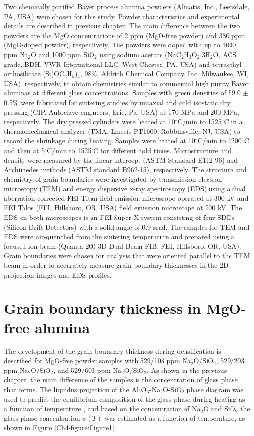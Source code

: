 Two chemically purified Bayer process alumina powders (Almatis, Inc., Leetsdale, PA, USA) were chosen for this study. Powder characteristics and experimental details are described in previous chapter. The main difference between the two powders are the MgO concentrations of 2 ppm (MgO-free powder) and 380 ppm (MgO-doped powder), respectively. The powders were doped with up to 1000 ppm Na$_{2}$O and 1000 ppm SiO$_{2}$ using sodium acetate (NaC$_{2}$H$_{3}$O$_{2}$$\cdot$3H$_{2}$O, ACS grade, BDH, VWR International LLC, West Chester, PA, USA) and tetraethyl orthosilicate (Si(OC$_{2}$H$_{5}$)$_{4}$, 98\%, Aldrich Chemical Company, Inc. Milwaukee, WI, USA), respectively, to obtain chemistries similar to commercial high purity Bayer aluminas at different glass concentrations. Samples with green densities of 59.0 $\pm$ 0.5\% were fabricated for sintering studies by uniaxial and cold isostatic dry pressing (CIP, Autoclave engineers, Erie, Pa, USA) at 170 MPa and 200 MPa, respectively. The dry pressed cylinders were heated at 10$^{\circ}$C/min to 1525$^{\circ}$C in a thermomechanical analyzer (TMA, Linseis PT1600, Robbinsville, NJ, USA) to record the shrinkage during heating. Samples were heated at 10$^{\circ}$C/min to 1200$^{\circ}$C and then at 5$^{\circ}$C/min to 1525$^{\circ}$C for different hold times. Microstructure and density were measured by the linear intercept (ASTM Standard E112-96) \cite{Standard2013} and Archimedes methods (ASTM standard B962-15), \cite{Standard2015} respectively. The structure and chemistry of grain boundaries were investigated by transmission electron microscopy (TEM) and energy dispersive x-ray spectroscopy (EDS) using a dual aberration corrected FEI Titan \cite{Clarke1987} field emission microscope operated at 300 kV and FEI Talos (FEI, Hillsboro, OR, USA) field emission microscope at 200 kV. The EDS on both microscopes is an FEI Super-X system consisting of four SDDs (Silicon Drift Detectors) with a solid angle of 0.9 srad. The samples for TEM and EDS were air-quenched from the sintering temperature and prepared using a focused ion beam (Quanta 200 3D Dual Beam FIB, FEI, Hillsboro, OR, USA).  Grain boundaries were chosen for analysis that were oriented parallel to the TEM beam in order to accurately measure grain boundary thicknesses in the 2D projection images and EDS profiles.

\section{Grain boundary thickness in MgO-free alumina}
The development of the grain boundary thickness during densification is described for MgO-free powder samples with 529/103 ppm Na$_{2}$O/SiO$_{2}$, 529/203 ppm Na$_{2}$O/SiO$_{2}$, and 529/603 ppm Na$_{2}$O/SiO$_{2}$. As shown in the previous chapter, the main difference of the samples is the concentration of glass phase that forms. The liquidus projection of the Al$_{2}$O$_{3}$-Na$_{2}$O-SiO$_{2}$ phase diagram \cite{Svoboda1996} was used to predict the equilibrium composition of the glass phase during heating as a function of temperature \cite{Frueh2016a}, and based on the concentration of Na$_{2}$O and SiO$_{2}$ the glass phase concentration $\phi(T)$ was estimated as a function of temperature, as shown in Figure \ref{Ch4-figure:Figure1}. 

